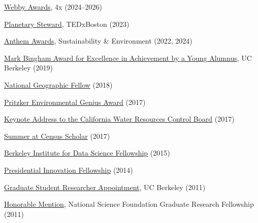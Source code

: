 \documentclass[10pt,letterpaper]{article}
\renewenvironment{itemize}{
  \begin{list}{}{
    \setlength{\leftmargin}{1.5em}
    \setlength{\itemsep}{0.25em}
    \setlength{\parskip}{0pt}
    \setlength{\parsep}{0.25em}
  }
}{
  \end{list}
}
\begin{document}
\begin{itemize}
  \item \href{https://winners.webbyawards.com/2024/websites-and-mobile-sites/general-desktop-mobile-sites/sustainability-environment/287895/oceans-futures--wwf}{Webby Awards}, 4x (2024--2026)
  \item \href{https://tedxboston.com/portfolio/planetary-stewardship-november-2023/}{Planetary Steward}, TEDxBoston (2023)
  \item \href{https://www.anthemawards.com/winners/list/#sustainability-environment-climate/all/1985/-1}{Anthem Awards}, Sustainability \& Environment (2022, 2024)
  \item \href{https://awards.berkeley.edu/achievement-awards/mark-bingham/recipients}{Mark Bingham Award for Excellence in Achievement by a Young Alumnus}, UC Berkeley (2019)
  \item \href{https://www.nationalgeographic.org/explorers}{National Geographic Fellow} (2018)
  \item \href{https://www.ioes.ucla.edu/article/dan-hammer-wins-inaugural-pritzker-award/}{Pritzker Environmental Genius Award} (2017)
  \item \href{http://slides.com/danhammer/ca-waterboards}{Keynote Address to the California Water Resources Control Board} (2017)
  \item \href{https://www.census.gov/research/summer_at_census/summer_2017.html}{Summer at Census Scholar} (2017)
  \item \href{http://bids.berkeley.edu/people}{Berkeley Institute for Data Science Fellowship} (2015)
  \item \href{http://www.whitehouse.gov/innovationfellows/meet-the-fellows}{Presidential Innovation Fellowship} (2014)
  \item \href{http://are.berkeley.edu/news/2015/01/grad-student-heads-washington}{Graduate Student Researcher Appointment}, UC Berkeley (2011)
  \item \href{https://www.fastlane.nsf.gov/grfp/AwardeeList.do?method=loadAwardeeList}{Honorable Mention}, National Science Foundation Graduate Research Fellowship (2011)

\end{itemize}
\end{document}

